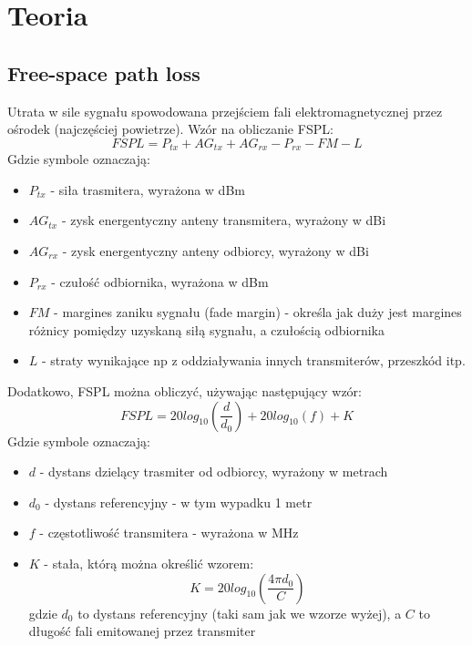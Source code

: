 \chapter{Teoria}
\label{cha:teoria}

\section{Free-space path loss}		  		  
Utrata w sile sygnału spowodowana przejściem fali elektromagnetycznej przez ośrodek (najczęściej powietrze).
Wzór na obliczanie FSPL:
\begin{equation}
FSPL = P_{tx} + AG_{tx} + AG_{rx} - P_{rx} - FM - L
\end{equation}
Gdzie symbole oznaczają:
\begin{itemize}
	\item $P_{tx}$ - siła trasmitera, wyrażona w dBm
	\item $AG_{tx}$ - zysk energentyczny anteny transmitera, wyrażony w dBi
	\item $AG_{rx}$ - zysk energentyczny anteny odbiorcy, wyrażony w dBi
	\item $P_{rx}$ - czułość odbiornika, wyrażona w dBm
	\item $FM$ - margines zaniku sygnału (fade margin) - określa jak duży jest margines różnicy pomiędzy uzyskaną siłą sygnału, a czułością odbiornika
	\item $L$ - straty wynikające np z oddziaływania innych transmiterów, przeszkód itp.
\end{itemize}
Dodatkowo, FSPL można obliczyć, używając następujący wzór:
\begin{equation}
FSPL = 20log_{10}\left(\frac{d}{d_{0}}\right) + 20log_{10}(f) + K
\end{equation}
Gdzie symbole oznaczają:
\begin{itemize}
	\item $d$ - dystans dzielący trasmiter od odbiorcy, wyrażony w metrach
	\item $d_{0}$ - dystans referencyjny -  w tym wypadku 1 metr
	\item $f$ - częstotliwość transmitera - wyrażona w MHz
	\item $K$ - stała, którą można określić wzorem:
	\begin{equation}
	K = 20log_{10}\left(\frac{4\pi d_{0}}{C}\right)
	\end{equation}
	gdzie $d_{0}$ to dystans referencyjny (taki sam jak we wzorze wyżej), a $C$ to długość fali emitowanej przez transmiter
\end{itemize}	  
